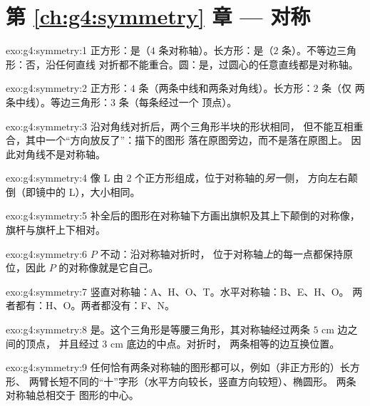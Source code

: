 \section*{第 \ref{ch:g4:symmetry} 章 --- 对称}

\begin{solution}{exo:g4:symmetry:1}
正方形：是（$4$ 条对称轴）。长方形：是（$2$ 条）。不等边三角形：否，沿任何直线
对折都不能重合。圆：是，过圆心的任意直线都是对称轴。
\end{solution}

\begin{solution}{exo:g4:symmetry:2}
正方形：$4$ 条（两条中线和两条对角线）。长方形：$2$ 条（仅
两条中线）。等边三角形：$3$ 条（每条经过一个
顶点）。
\end{solution}

\begin{solution}{exo:g4:symmetry:3}
沿对角线对折后，两个三角形半块的形状相同，
但不能互相重合，其中一个“方向放反了”：描下的图形
落在原图旁边，而不是落在原图上。
因此对角线不是对称轴。
\end{solution}

\begin{solution}{exo:g4:symmetry:4}
像 L 由 $2$ 个正方形组成，位于对称轴的\emph{另一}侧，
方向左右颠倒（即镜中的 L），大小相同。
\end{solution}

\begin{solution}{exo:g4:symmetry:5}
补全后的图形在对称轴下方画出旗帜及其上下颠倒的对称像，
旗杆与旗杆上下相对。
\end{solution}

\begin{solution}{exo:g4:symmetry:6}
$P$ 不动：沿对称轴对折时，
位于对称轴\emph{上}的每一点都保持原位，因此 $P$ 的对称像就是它自己。
\end{solution}

\begin{solution}{exo:g4:symmetry:7}
竖直对称轴：A、H、O、T。水平对称轴：B、E、H、O。
两者都有：H、O。两者都没有：F、N。
\end{solution}

\begin{solution}{exo:g4:symmetry:8}
是。这个三角形是等腰三角形，其对称轴经过两条 $5$ cm 边之间的顶点，
并且经过 $3$ cm 底边的中点。对折时，
两条相等的边互换位置。
\end{solution}

\begin{solution}{exo:g4:symmetry:9}
任何恰有两条对称轴的图形都可以，例如（非正方形的）长方形、
两臂长短不同的“十”字形（水平方向较长，竖直方向较短）、椭圆形。
两条对称轴总相交于
图形的中心。
\end{solution}


